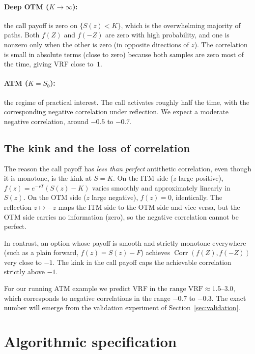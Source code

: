 \documentclass[11pt,a4paper]{article}
\theoremstyle{plain}
\theoremstyle{definition}
\theoremstyle{remark}
\newcommand{\Corr}{\operatorname{Corr}}
\begin{document}
\paragraph{Deep OTM ($K \to \infty$):} the call payoff is zero on
$\{S(z) < K\}$, which is the overwhelming majority of paths. Both
$f(Z)$ and $f(-Z)$ are zero with high probability, and one is
nonzero only when the other is zero (in opposite directions of $z$).
The correlation is small in absolute terms (close to zero) because
both samples are zero most of the time, giving VRF close to~$1$.

\paragraph{ATM ($K = S_0$):} the regime of practical interest. The
call activates roughly half the time, with the corresponding negative
correlation under reflection. We expect a moderate negative
correlation, around $-0.5$ to $-0.7$.

\subsection{The kink and the loss of correlation}

The reason the call payoff has \emph{less than perfect} antithetic
correlation, even though it is monotone, is the kink at $S = K$. On
the ITM side ($z$ large positive), $f(z) = e^{-rT}(S(z) - K)$
varies smoothly and approximately linearly in $S(z)$. On the OTM
side ($z$ large negative), $f(z) = 0$, identically. The reflection
$z \mapsto -z$ maps the ITM side to the OTM side and vice versa, but
the OTM side carries no information (zero), so the negative
correlation cannot be perfect.

In contrast, an option whose payoff is smooth and strictly monotone
everywhere (such as a plain forward, $f(z) = S(z) - F$) achieves
$\Corr(f(Z), f(-Z))$ very close to $-1$. The kink in the call payoff
caps the achievable correlation strictly above $-1$.

For our running ATM example we predict VRF in the range
$\mathrm{VRF} \approx 1.5$--$3.0$, which corresponds to negative
correlations in the range $-0.7$ to $-0.3$. The exact number will
emerge from the validation experiment of Section~\ref{sec:validation}.

\section{Algorithmic specification}
\label{sec:algorithm}
\end{document}
